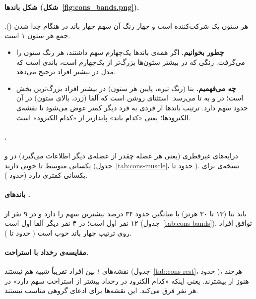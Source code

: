 \paragraph{شکل باندها (شکل~\ref{fig:cons_bands.png}).} هر ستون یک شرکت‌کننده است و چهار رنگ آن سهم چهار باند  در  هنگام جدا شدن (). جمع هر ستون ۱ است.
\begin{itemize}
\item \textbf{چطور بخوانیم.} اگر همه‌ی باندها یک‌چهارم سهم داشتند، هر رنگ  ستون را می‌گرفت. رنگی که در بیشتر ستون‌ها بزرگ‌تر از یک‌چهارم است، باندی است که مدل در بیشتر افراد ترجیح می‌دهد.
\item \textbf{چه می‌فهمیم.} بتا (رنگ تیره، پایین هر ستون) در بیشتر افراد بزرگ‌ترین بخش است؛ در  و  به  تا  می‌رسد. استثنای روشن  است که آلفا (زرد، بالای ستون) در آن حدود  سهم دارد. ترتیب باندها از فردی به فرد دیگر کمتر عوض می‌شود تا نقشه‌ی الکترودها؛ یعنی «کدام باند» پایدارتر از «کدام الکترود» است.
\end{itemize}



\paragraph{.} درایه‌های غیرقطری  (یعنی هر عضله چقدر از عضله‌ی دیگر اطلاعات می‌گیرد) در  و  یکسانی متوسط تا خوبی دارند (جدول~\ref{tab:cons-muscle}،  حدود  تا ). نسخه‌ی  برای  یکسانی کمتری دارد (حدود ).

\paragraph{باندهای .} باند بتا (۱۳ تا ۳۰ هرتز) با میانگین حدود ۳۴ درصد بیشترین سهم را دارد و در ۹ نفر از ۱۲ نفر اول است؛ در ۳ نفر دیگر آلفا اول است (جدول~\ref{tab:cons-bands}). توافق افراد روی ترتیب چهار باند خوب است ( حدود  تا ).

\paragraph{مقایسه‌ی رخداد با استراحت.} نقشه‌های $t$ بین افراد تقریباً شبیه هم نیستند (جدول~\ref{tab:cons-rest}،  حدود )، هرچند هنوز از  بیشترند. یعنی اینکه «کدام الکترود در رخداد بیشتر از استراحت سهم دارد» در هر نفر فرق می‌کند. این نقشه‌ها برای ادعای گروهی مناسب نیستند.

